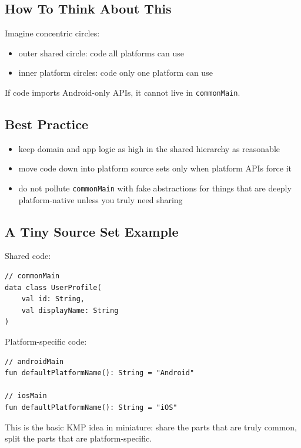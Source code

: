\documentclass[11pt,a4paper]{article}
\begin{document}
\subsection{How To Think About This}

Imagine concentric circles:
\begin{itemize}
    \item outer shared circle: code all platforms can use
    \item inner platform circles: code only one platform can use
\end{itemize}

If code imports Android-only APIs, it cannot live in \texttt{commonMain}.

\subsection{Best Practice}

\begin{itemize}
    \item keep domain and app logic as high in the shared hierarchy as reasonable
    \item move code down into platform source sets only when platform APIs force it
    \item do not pollute \texttt{commonMain} with fake abstractions for things that are deeply platform-native unless you truly need sharing
\end{itemize}

\subsection{A Tiny Source Set Example}

Shared code:

\begin{lstlisting}[style=kazekotlin]
// commonMain
data class UserProfile(
    val id: String,
    val displayName: String
)
\end{lstlisting}

Platform-specific code:

\begin{lstlisting}[style=kazekotlin]
// androidMain
fun defaultPlatformName(): String = "Android"

// iosMain
fun defaultPlatformName(): String = "iOS"
\end{lstlisting}

This is the basic KMP idea in miniature: share the parts that are truly common, split the parts that are platform-specific.
\end{document}
